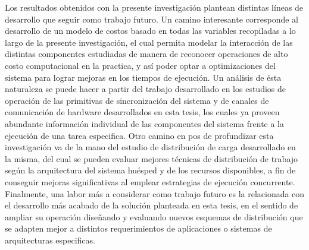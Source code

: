 \begin{conclusion}
Los resultados obtenidos con la presente investigación plantean distintas líneas de desarrollo que seguir como trabajo futuro. Un camino interesante corresponde al desarrollo de un modelo de costos basado en todas las variables recopiladas a lo largo de la presente investigación, el cual permita modelar la interacción de las distintas componentes estudiadas de manera de reconocer operaciones de alto costo computacional en la practica, y así poder optar a optimizaciones del sistema para lograr mejoras en los tiempos de ejecución. Un análisis de ésta naturaleza se puede hacer a partir del trabajo desarrollado en los estudios de operación de las primitivas de sincronización del sistema y de canales de comunicación de hardware desarrollados en esta tesis, los cuales ya proveen abundante información individual de las componentes del sistema frente a la ejecución de una tarea especifica. Otro camino en pos de profundizar esta investigación va de la mano del estudio de distribución de carga desarrollado en la misma, del cual se pueden evaluar mejores técnicas de distribución de trabajo según la arquitectura del sistema huésped y de los recursos disponibles, a fin de conseguir mejoras significativas al emplear estrategias de ejecución concurrente. Finalmente, una labor más a considerar como trabajo futuro es la relacionada con el desarrollo más acabado de la solución planteada en esta tesis, en el sentido de ampliar su operación diseñando y evaluando nuevos esquemas de distribución que se adapten mejor a distintos requerimientos de aplicaciones o sistemas de arquitecturas especificas.
\end{conclusion}
